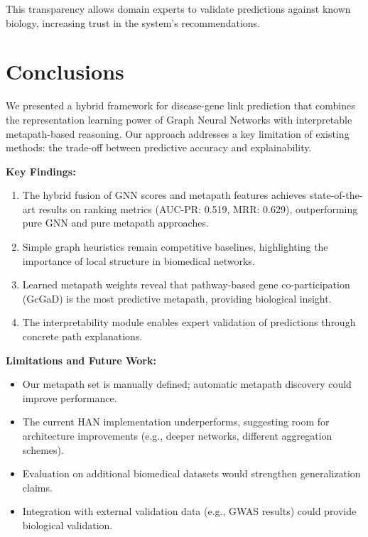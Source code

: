 \documentclass[11pt]{article}
\begin{document}
This transparency allows domain experts to validate predictions against known biology, increasing trust in the system's recommendations.

\section{Conclusions}
\label{sec:conclusion}

We presented a hybrid framework for disease-gene link prediction that combines the representation learning power of Graph Neural Networks with interpretable metapath-based reasoning. Our approach addresses a key limitation of existing methods: the trade-off between predictive accuracy and explainability.

\textbf{Key Findings:}
\begin{enumerate}
    \item The hybrid fusion of GNN scores and metapath features achieves state-of-the-art results on ranking metrics (AUC-PR: 0.519, MRR: 0.629), outperforming pure GNN and pure metapath approaches.

    \item Simple graph heuristics remain competitive baselines, highlighting the importance of local structure in biomedical networks.

    \item Learned metapath weights reveal that pathway-based gene co-participation (GcGaD) is the most predictive metapath, providing biological insight.

    \item The interpretability module enables expert validation of predictions through concrete path explanations.
\end{enumerate}

\textbf{Limitations and Future Work:}
\begin{itemize}
    \item Our metapath set is manually defined; automatic metapath discovery could improve performance.
    \item The current HAN implementation underperforms, suggesting room for architecture improvements (e.g., deeper networks, different aggregation schemes).
    \item Evaluation on additional biomedical datasets would strengthen generalization claims.
    \item Integration with external validation data (e.g., GWAS results) could provide biological validation.
\end{itemize}
\end{document}
